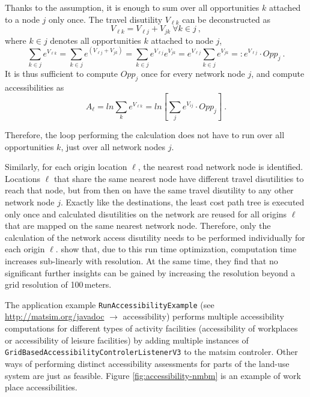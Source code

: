 Thanks to the assumption, it is enough to sum over all opportunities $k$ attached to a node $j$ only 
once. The travel disutility $V_{\ell k}$ can be deconstructed as
\begin{equation}
V_{\ell k} = V_{\ell j} + V_{jk} \ \forall k \in j \ ,
\end{equation}
where $k \in j$ denotes all opportunities $k$ attached to node $j$,
\begin{equation}
\sum_{k \in j} e^{ V_{\ell k}} 
%
= \sum_{k \in j} e^{ (V_{\ell j}+ V_{jk})} 
%
= \sum_{k \in j} e^{ V_{\ell j}} e^{ V_{jk}} 
%
= e^{ V_{\ell j}} \sum_{k \in j} e^{ V_{jk}} 
%
=: e^{ V_{\ell j}} \cdot Opp_j \ .
\end{equation} 
It is thus sufficient to compute $Opp_j$ once for every network node $j$, and compute accessibilities as
\begin{equation}
A_\ell = ln \sum_k e^{ V_{\ell k}}
%
= ln \left[ \sum_j e^{ V_{ij}} \cdot Opp_j \right] \ .
\end{equation}

Therefore, the loop performing the calculation does not have to run over all opportunities $k$, 
just over all network nodes $j$.

Similarly, for each origin location $\ell$, the nearest road network node is identified.
Locations $\ell$ that share the same nearest node have different travel disutilities to reach that node, but from then on have the same travel disutility to any other network
node $j$. Exactly like the destinations, the least cost path tree is executed
only once and calculated disutilities on the network are reused for all origins $\ell$ 
that are mapped on the same nearest network node. Therefore, only the calculation of the network access disutility 
needs to be performed individually for each origin $\ell$.
\citet{NicolaiNagelHiResAccessibilityMethod} show that, due to this run time optimization, computation
time increases sub-linearly with resolution. At the same time, they find that no significant further
insights can be gained by increasing the resolution beyond a grid resolution of 100\,meters.

The application example \lstinline{RunAccessibilityExample} (see \url{http://matsim.org/javadoc} $\to$ 
accessibility) performs multiple accessibility computations for
different types of activity facilities (\eg accessibility of workplaces or accessibility of leisure
facilities) by adding multiple instances of \lstinline{GridBasedAccessibilityControlerListenerV3}
to the \gls{matsim} controler. Other ways of performing distinct accessibility assessments for parts of
the land-use system are just as feasible. Figure \ref{fig:accessibility-nmbm} is an example of
 work place accessibilities.

